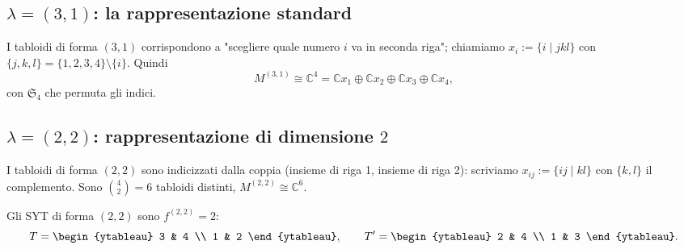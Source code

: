 
\subsection{$ \lambda = (3,1) $: la rappresentazione standard}

I tabloidi di forma $ (3,1) $ corrispondono a "scegliere quale numero $ i $ va in seconda
riga"; chiamiamo $ x_i := \{i \mid jkl\} $ con $ \{j,k,l\} = \{1,2,3,4\} \setminus \{i\} $.
Quindi
\[
  M^{(3,1)} \cong \mathbb{C}^4 = \mathbb{C} x_1 \oplus \mathbb{C} x_2 \oplus \mathbb{C} x_3 \oplus \mathbb{C} x_4,
\]
con $ \mathfrak{S}_4 $ che permuta gli indici.



\subsection{$ \lambda = (2,2) $: rappresentazione di dimensione $ 2 $}

I tabloidi di forma $ (2,2) $ sono indicizzati dalla coppia (insieme di riga 1, insieme di
riga 2): scriviamo $ x_{ij} := \{ij \mid kl\} $ con $ \{k,l\} $ il complemento. Sono
$ \binom{4}{2} = 6 $ tabloidi distinti, $ M^{(2,2)} \cong \mathbb{C}^6 $.

Gli SYT di forma $ (2,2) $ sono $ f^{(2,2)} = 2 $:
\[
  T = \begin{ytableau} 3 & 4 \\ 1 & 2 \end{ytableau}, \qquad
  T' = \begin{ytableau} 2 & 4 \\ 1 & 3 \end{ytableau}.
\]

